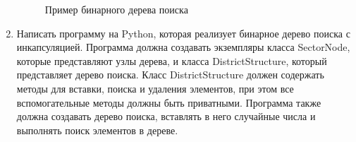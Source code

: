 \begin{enumerate}
\begin{figure}[h]
\centering
{}
\caption{Пример бинарного дерева поиска}
\end{figure}

\item Написать программу на Python, которая реализует бинарное дерево поиска с инкапсуляцией. Программа должна создавать экземпляры класса SectorNode, которые представляют узлы дерева, и класса DistrictStructure, который представляет дерево поиска. Класс DistrictStructure должен содержать методы для вставки, поиска и удаления элементов, при этом все вспомогательные методы должны быть приватными. Программа также должна создавать дерево поиска, вставлять в него случайные числа и выполнять поиск элементов в дереве.


\end{enumerate}
